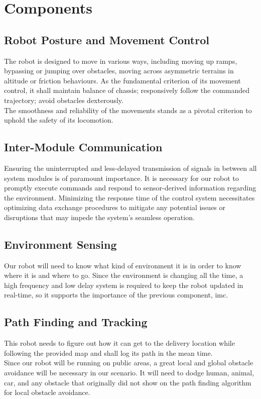 \documentclass{article}
\begin{document}
\section{Components}
\subsection{Robot Posture and Movement Control}
The robot is designed to move in various ways, including moving up ramps, bypassing or jumping over obstacles, moving across asymmetric terrains in altitude or friction behaviours. As the fundamental criterion of its movement control, it shall maintain balance of chassis; responsively follow the commanded trajectory; avoid obstacles dexterously. \\
The smoothness and reliability of the movements stands as a pivotal criterion to uphold the safety of its locomotion.
\subsection{Inter-Module Communication}
Ensuring the uninterrupted and less-delayed transmission of signals in between all system modules is of paramount importance. It is necessary for our robot to promptly execute commands and respond to sensor-derived information regarding the environment. Minimizing the response time of the control system necessitates optimizing data exchange procedures to mitigate any potential issues or disruptions that may impede the system's seamless operation.
\subsection{Environment Sensing}
Our robot will need to know what kind of environment it is in order to know where it is and where to go. Since the environment is changing all the time, a high frequency and low delay system is required to keep the robot updated in real-time, so it supports the importance of the previous component, \gls{imc}.
\subsection{Path Finding and Tracking}
This robot needs to figure out how it can get to the delivery location while following the provided map and shall log its path in the mean time. \\
Since our robot will be running on public areas, a great local and global obstacle avoidance will be necessary in our scenario. It will need to dodge human, animal, car, and any obstacle that originally did not show on the path finding algorithm for local obstacle avoidance. 
\end{document}
